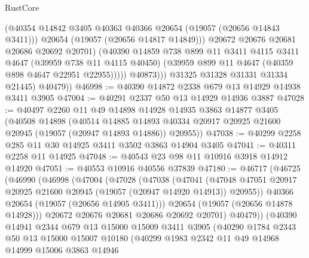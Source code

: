 \begin{lexlean}{RustCore}
\begin{coremodule}
                        (@40354 @14842 @3405 @40363 @40366 @20654 (@19057 (@20656 @14843 @3411)))
                        @20654
                        (@19057 (@20656 @14817 @14849)))
                      @20672
                      @20676
                      @20681
                      @20686
                      @20692
                      @20701)
                    (@40390
                      @14859
                      @738
                      @899
                      @11
                      @3411
                      @4115
                      @3411
                      @4647
                      (@39959 @738 @11 @4115 @40450)
                      (@39959 @899 @11 @4647 (@40359 @898 @4647 @22951 @22955)))))
                @40873)))
          @31325
          @31328
          @31331
          @31334
          @21445)
        @40479))
@46998 := @40390 @14872 @2338 @679 @13 @14929 @14938 @3411 @3905
@47004 := @40291 @2337 @50 @13 @14929 @14936 @3887
@47028 := @40497
    @2260
    @11
    @49
    @14898
    @14928
    @14935
    @3863
    @14877
    @3405
    (@40508
      @14898
      (@40514
        @14885
        @14893
        @40334
        @20917
        @20925
        @21600
        @20945
        (@19057 (@20947 @14893 @14886))
        @20955))
@47038 := @40299 @2258 @285 @11 @30 @14925 @3411 @3502 @3863 @14904 @3405
@47041 := @40311 @2258 @11 @14925
@47048 := @40543 @23 @98 @11 @10916 @3918 @14912 @14920
@47051 := @40553 @10916 @40556 @37839
@47180 := @46717
    (@46725
      (@46990
        (@46998
          (@47004
            (@47028
              (@47038
                (@47041
                  (@47048
                    @47051
                    @20917
                    @20925
                    @21600
                    @20945
                    (@19057 (@20947 @14920 @14913))
                    @20955))
                @40366
                @20654
                (@19057 (@20656 @14905 @3411)))
              @20654
              (@19057 (@20656 @14878 @14928)))
            @20672
            @20676
            @20681
            @20686
            @20692
            @20701)
          @40479))
      (@40390
        @14941
        @2344
        @679
        @13
        @15000
        @15009
        @3411
        @3905
        (@40290
          @1784
          @2343
          @50
          @13
          @15000
          @15007
          @10180
          (@40299
            @1983
            @2342
            @11
            @49
            @14968
            @14999
            @15006
            @3863
            @14946

\end{coremodule}
\end{lexlean}
